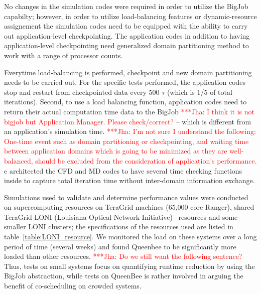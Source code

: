 \documentclass[conference,final]{IEEEtran}
\newcommand{\jhanote}[1]{ {\textcolor{red} { ***Jha: #1 }}}
\newcommand{\jhanote}[1]{}
\begin{document}
No changes in the simulation codes were required in order
to utilize the BigJob capabilty; however, in order
to utilize load-balancing features or dynamic-resource
assignement the simulation codes need to be equipped
with the ability to carry out application-level checkpointing.
The application codes in addition to having application-level
checkpointing need generalized domain partitioning method to work
with a range of processor counts.



Everytime load-balancing is performed, checkpoint and new domain
partitioning needs to be carried out. For the specific tests
performed, the application codes stop and restart from checkpointed
data every 500 $\tau$ (which is 1/5 of total iterations). Second, to
use a load balancing function, application codes need to return their
actual computation time data to the BigJob \jhanote{I think it is not
  bigjob but Application Manager. Please check/correct?}  -- which is
different from an application's simulation time.  \jhanote{I'm not
  sure I understand the following: One-time event such as domain
  partitioning or checkpointing, and waiting time between application
  domains which is going to be minimized as they are well-balanced,
  should be excluded from the consideration of application's
  performance.}  e architected the CFD and MD codes to have several
time checking functions inside to capture total iteration time without
inter-domain information exchange.

Simulations used to validate and determine performance values were
conducted on supercomputing resources on TeraGrid machines (65,000
core Ranger), shared TeraGrid-LONI (Louisiana Optical Network
Initiative)~\cite{LONI_web} resources and some smaller LONI clusters;
the specifications of the resources used are listed in
table~\ref{table:LONI_resource}.  We monitored the load on these
systems over a long period of time (several weeks) and found Queenbee
to be significantly more loaded than other resources.  \jhanote{Do we
  still want the following sentence?} Thus, tests on small systems
focus on quantifying runtime reduction by using the BigJob
abstraction, while tests on QueenBee is rather involved in arguing the
benefit of co-scheduling on crowded systems.
\end{document}
